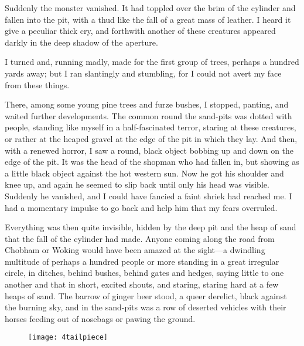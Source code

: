 Suddenly the monster vanished. It had toppled over the brim of the cylinder and fallen into the pit, with a thud like the fall of a great mass of leather. I heard it give a peculiar thick cry, and forthwith another of these creatures appeared darkly in the deep shadow of the aperture.

I turned and, running madly, made for the first group of trees, perhaps a hundred yards away; but I ran slantingly and stumbling, for I could not avert my face from these things.

There, among some young pine trees and furze bushes, I stopped, panting, and waited further developments. The common round the sand-pits was dotted with people, standing like myself in a half-fascinated terror, staring at these creatures, or rather at the heaped gravel at the edge of the pit in which they lay. And then, with a renewed horror, I saw a round, black object bobbing up and down on the edge of the pit. It was the head of the shopman who had fallen in, but showing as a little black object against the hot western sun. Now he got his shoulder and knee up, and again he seemed to slip back until only his head was visible. Suddenly he vanished, and I could have fancied a faint shriek had reached me. I had a momentary impulse to go back and help him that my fears overruled.

Everything was then quite invisible, hidden by the deep pit and the heap of sand that the fall of the cylinder had made. Anyone coming along the road from Chobham or Woking would have been amazed at the sight—a dwindling multitude of perhaps a hundred people or more standing in a great irregular circle, in ditches, behind bushes, behind gates and hedges, saying little to one another and that in short, excited shouts, and staring, staring hard at a few heaps of sand. The barrow of ginger beer stood, a queer derelict, black against the burning sky, and in the sand-pits was a row of deserted vehicles with their horses feeding out of nosebags or pawing the ground.

\begin{figure}[b!]
\centering
\texttt{[image: 4tailpiece]}
\end{figure}